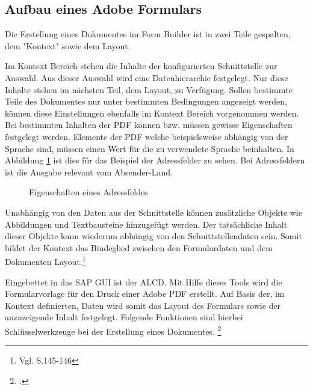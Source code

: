 \subsection{Aufbau eines Adobe Formulars}

Die Erstellung eines Dokumentes im Form Builder ist in zwei Teile gespalten, dem "Kontext" sowie dem Layout. 

Im Kontext Bereich stehen die Inhalte der konfigurierten Schnittstelle zur Auswahl. Aus dieser Auswahl wird eine Datenhierarchie festgelegt. Nur diese Inhalte stehen im nächsten Teil, dem Layout, zu Verfügung. Sollen bestimmte Teile des Dokumentes nur unter bestimmten Bedingungen angezeigt werden, können diese Einstellungen ebenfalls im Kontext Bereich vorgenommen werden. Bei bestimmten Inhalten der PDF können bzw. müssen gewisse Eigenschaften festgelegt werden.
 Elemente der PDF welche beispielsweise abhängig von der Sprache sind, müssen einen Wert für die zu verwendete Sprache beinhalten. In Abbildung \ref{figAD} ist dies für das Beispiel der Adressfelder zu sehen. Bei Adressfeldern ist die Ausgabe relevant vom Absender-Land.
 
 \begin{figure}[ht]
 	\centering
 	
 	\caption{Eigenschaften eines Adressfeldes}
 	\label{figAD}
 	
 \end{figure}

Unabhängig von den Daten aus der Schnittstelle können zusätzliche Objekte wie Abbildungen und Textbausteine hinzugefügt werden. Der tatsächliche Inhalt dieser Objekte kann wiederum abhängig von den Schnittstellendaten sein. Somit bildet der Kontext das Bindeglied zwischen den Formulardaten und dem Dokumenten Layout.\footnote{Vgl. \cite{Hauser.2015} S.145-146} 

Eingebettet in das SAP \ac{GUI} ist der \ac{ALCD}. Mit Hilfe dieses Tools wird die Formularvorlage für den Druck einer Adobe PDF erstellt. Auf Basis der, im Kontext definierten, Daten wird somit das Layout des Formulars sowie der anzuzeigende Inhalt festgelegt. Folgende Funktionen sind hierbei Schlüsselwerkzeuge bei der Erstellung eines Dokumentes. \footcite{Hauser.2015}

